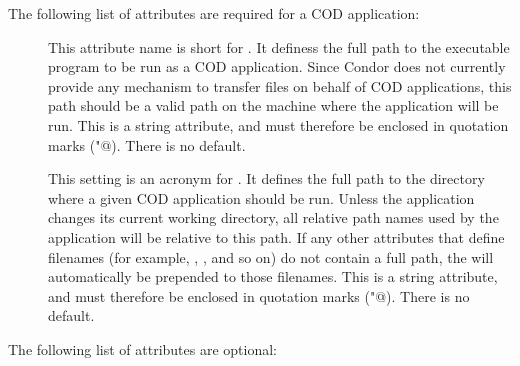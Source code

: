 

The following list of attributes are required for a COD application:

\begin{description}

 \item[] This attribute name is short for .
   It definess the full path to the executable program to be run as a
   COD application.
   Since Condor does not currently provide any mechanism to transfer
   files on behalf of COD applications, this path should be a valid
   path on the machine where the application will be run.
   This is a string attribute, and must therefore be enclosed in
   quotation marks (\verb@"@).
   There is no default.

 \item[] This setting is an acronym for .
   It defines the full path to the directory where a given COD
   application should be run.
   Unless the application changes its current working directory, all
   relative path names used by the application will be relative to
   this path.
   If any other attributes that define filenames (for example,
   , , and so on) do not contain a full path, the
    will automatically be prepended to those filenames.
   This is a string attribute, and must therefore be enclosed in 
   quotation marks (\verb@"@).
   There is no default.

\end{description}


The following list of attributes are optional:

